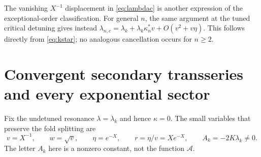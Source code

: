 \documentclass[11pt,a4paper]{article}
\numberwithin{equation}{section}
\theoremstyle{definition}\newtheorem{definition}[theorem]{Definition}
\theoremstyle{remark}\newtheorem{remark}[theorem]{Remark}
\newcommand{\A}{\mathcal A}\newcommand{\E}{\mathcal E}
\begin{document}
The vanishing $X^{-1}$ displacement in \eqref{eq:lambdac} is another
expression of the exceptional-order classification. For general $n$, the
same argument at the tuned critical detuning gives instead
$\lambda_{n,c}=\lambda_k+\lambda_k\kappa_n^*v+O(v^2+v\eta)$.
This follows directly from \eqref{eq:kstar}; no analogous cancellation
occurs for $n\ge2$.

\section{Convergent secondary transseries and every exponential sector}
\label{sec:sectors}
Fix the undetuned resonance $\lambda=\lambda_k$ and hence $\kappa=0$.
The small variables that preserve the fold splitting are
\begin{equation}\label{eq:wr}
 v=X^{-1},\qquad w=\sqrt v,\qquad
 \eta=e^{-X},\qquad r=\eta/v=Xe^{-X},\qquad A_k=-2K\lambda_k\ne0.
\end{equation}
The letter $A_k$ here is a nonzero constant, not the function $\A$.
\end{document}
